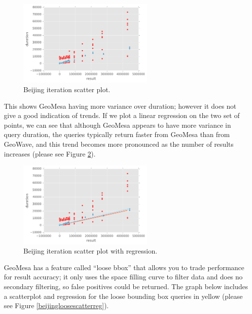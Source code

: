\begin{figure}[h!tb]
  \centering
  \includegraphics[width=0.60\textwidth]{../docs/img/geolife-bbox-scatter.png}
  \caption{Beijing iteration scatter plot.}
  \label{beijingscatter}
\end{figure}

This shows GeoMesa having more variance over duration; however it does not give a good indication of trends.
If we plot a linear regression on the two set of points, we can see that although GeoMesa appears to have
more variance in query duration, the queries typically return faster from GeoMesa than from GeoWave, and this
trend becomes more pronounced as the number of results increases (please see Figure \ref{beijingscatterreg}).

\begin{figure}[h!tb]
  \centering
  \includegraphics[width=0.60\textwidth]{../docs/img/geolife-bbox-scatter-with-regression.png}
  \caption{Beijing iteration scatter plot with regression.}
  \label{beijingscatterreg}
\end{figure}

GeoMesa has a feature called ``loose bbox'' that allows you to trade performance for result accuracy;
it only uses the space filling curve to filter data and does no secondary filtering, so false positives
could be returned. The graph below includes a scatterplot and regression for the loose bounding box queries in yellow
(please see Figure \ref{beijingloosescatterreg}).

